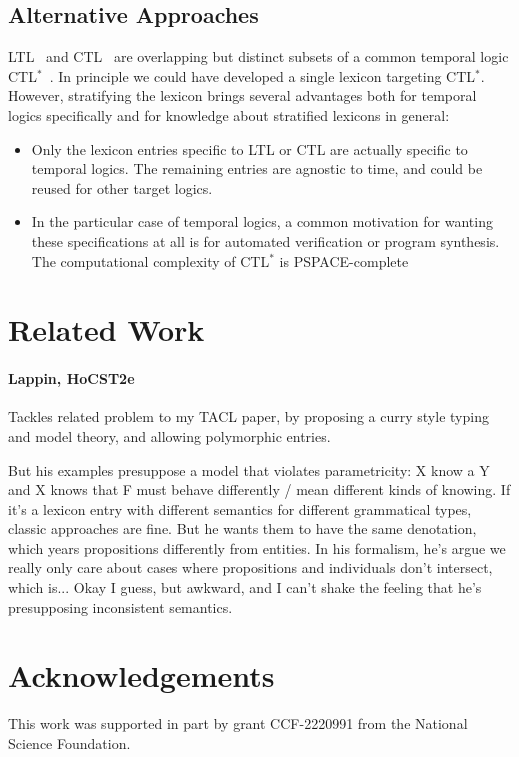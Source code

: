 \documentclass[11pt,a4paper,acceptedWithA]{article}
\newcommand{\grantno}{CCF-2220991\xspace}
\newcommand{\funder}{the National Science Foundation\xspace}
\begin{document}
\subsection{Alternative Approaches}
\textsc{LTL}~\cite{pnueli1977temporal} and \textsc{CTL}~\cite{clarke1981design} are overlapping but distinct subsets of a common temporal logic \textsc{CTL}${}^*$~\cite{emerson1986sometimes}. In principle we could have developed a single lexicon targeting \textsc{CTL}${}^*$. However, stratifying the lexicon brings several advantages both for temporal logics specifically and for knowledge about stratified lexicons in general:
\begin{itemize}
    \item Only the lexicon entries specific to \textsc{LTL} or \textsc{CTL} are actually specific to temporal logics. The remaining entries are agnostic to time, and could be reused for other target logics.
    \item In the particular case of temporal logics, a common motivation for wanting these specifications at all is for automated verification or program synthesis. The computational complexity of \textsc{CTL}${}^*$ is \textsc{PSPACE}-complete~ 
\end{itemize}



\section{Related Work}
\paragraph{Lappin, HoCST2e}
Tackles related problem to my TACL paper, by proposing a curry style typing and model theory, and allowing polymorphic entries.

But his examples presuppose a model that violates parametricity: X know a Y and X knows that F must behave differently / mean different kinds of knowing. If it's a lexicon entry with different semantics for different grammatical types, classic approaches are fine. But he wants them to have the same denotation, which years propositions differently from entities. In his formalism, he's argue we really only care about cases where propositions and individuals don't intersect, which is... Okay I guess, but awkward, and I can't shake the feeling that he's presupposing inconsistent semantics.

\section*{Acknowledgements}
This work was supported in part by grant \grantno from \funder.



\end{document}
